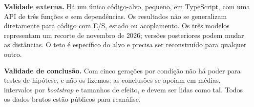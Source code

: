 \textbf{Validade externa.} Há um único código-alvo, pequeno, em TypeScript, com uma API de três funções e sem dependências. Os resultados não se generalizam diretamente para código com E/S, estado ou acoplamento. Os três modelos representam um recorte de novembro de 2026; versões posteriores podem mudar as distâncias. O teto é específico do alvo e precisa ser reconstruído para qualquer outro.

\textbf{Validade de conclusão.} Com cinco gerações por condição não há poder para testes de hipótese, e não os fizemos; as conclusões se apoiam em médias, intervalos por \textit{bootstrap} e tamanhos de efeito, e devem ser lidas como tal. Todos os dados brutos estão públicos para reanálise.
